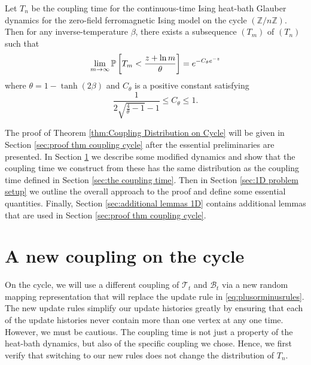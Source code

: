 

	\begin{theorem}
	\label{thm:Coupling Distribution on Cycle}
		Let $T_n$ be the coupling time for the continuous-time Ising heat-bath Glauber dynamics for the zero-field ferromagnetic Ising model on the cycle $(\mathbb{Z} / n\mathbb{Z})$. Then for any inverse-temperature $\beta$, there exists a subsequence $(T_m)$ of $(T_n)$ such that
		\begin{equation}
			\lim_{m \rightarrow \infty} \mathbb{P}\left[T_m < \frac{z + \ln m}{\theta}\right] = e^{-C_\theta e^{-z}}
		\end{equation}
		where $\theta = 1 - \tanh(2\beta)$ and $C_\theta$ is a positive constant satisfying
		\begin{equation}
			\frac{1}{2\sqrt{\frac{4}{\theta} - 1} - 1} \leq C_\theta \leq 1.
		\end{equation}
	\end{theorem}

	The proof of Theorem \ref{thm:Coupling Distribution on Cycle} will be given in Section \ref{sec:proof thm coupling cycle} after the essential preliminaries are presented. In Section \ref{sec:information percolation on the cycle} we describe some modified dynamics and show that the coupling time we construct from these has the same distribution as the coupling time defined in Section \ref{sec:the coupling time}. Then in Section \ref{sec:1D problem setup} we outline the overall approach to the proof and define some essential quantities. Finally, Section \ref{sec:additional lemmas 1D} contains additional lemmas that are used in Section \ref{sec:proof thm coupling cycle}.

	\section{A new coupling on the cycle}
	\label{sec:information percolation on the cycle}

	On the cycle, we will use a different coupling of $\mathscr{T}_t$ and $\mathscr{B}_t$ via a new random mapping representation that will replace the update rule in \eqref{eq:plusorminusrules}. The new update rules simplify our update histories greatly by ensuring that each of the update histories never contain more than one vertex at any one time. However, we must be cautious. The coupling time is not just a property of the heat-bath dynamics, but also of the specific coupling we chose. Hence, we first verify that switching to our new rules does not change the distribution of $T_n$. 

